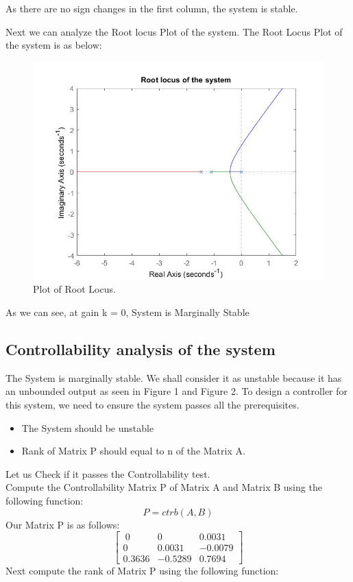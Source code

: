 \documentclass{article}
\begin{document}
\noindent As there are no sign changes in the first column, the system is stable.
\vskip30pt

\noindent Next we can analyze the Root locus Plot of the system. The Root Locus Plot of the system is as below:
\begin{figure}[h!]
\centering
\includegraphics[scale=0.5]{root_locus.jpg}
\caption{Plot of Root Locus.}
\end{figure}
\vskip10pt
\noindent As we can see, at gain k = 0, System is Marginally Stable


\subsection{Controllability analysis of the system}
\noindent The System is marginally stable. We shall consider it as unstable because it has an unbounded output as seen in Figure 1 and Figure 2. To design a controller for this system, we need to ensure the system passes all the prerequisites. \\

\noindent 
\begin{itemize}
\item The System should be unstable
\item Rank of Matrix P should equal to n of the Matrix A. \\
\end{itemize}

\noindent Let us Check if it passes the Controllability test. \\
\vskip10pt
\noindent Compute the Controllability Matrix P of Matrix A and Matrix B using the following function: \begin{equation} P = ctrb(A, B) \end{equation}\vskip10pt
\noindent Our Matrix P is as follows:
\begin{equation}
\begin{bmatrix}
\
0 & 0 & 0.0031 \\
0 & 0.0031 & -0.0079 \\
0.3636 & -0.5289 & 0.7694  \end{bmatrix}
\end{equation}
\vskip10pt
\noindent Next compute the rank of Matrix P using the following function: 
\end{document}
